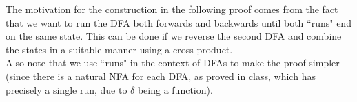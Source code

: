 

\begin{note}
    The motivation for the construction in the following proof comes from the fact that we want to run the DFA both forwards and backwards until both ``runs" end on the same state. This can be
    done if we reverse the second DFA and combine the states in a suitable manner using a cross product.\\

    Also note that we use ``runs" in the context of DFAs to make the proof simpler (since there is a natural NFA for each DFA, as proved in class, which has precisely a single run, due to $\delta$ being a function).
\end{note}


